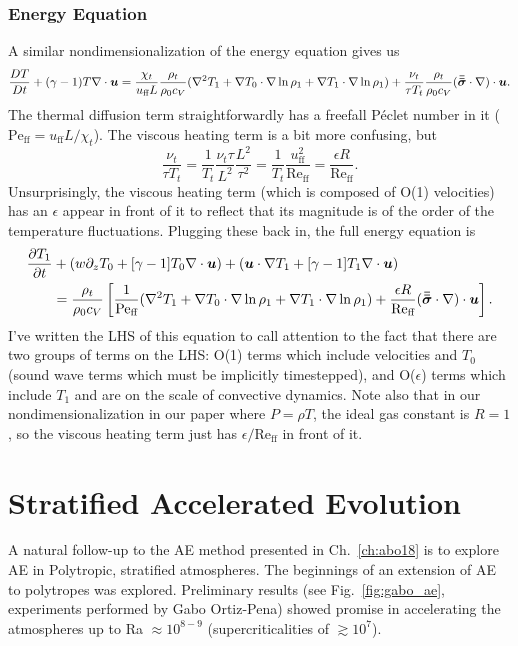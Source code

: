 \subsubsection{Energy Equation}
A similar nondimensionalization of the energy equation gives us
\begin{equation}
\frac{D T}{D t} + (\gamma-1)T \nabla\cdot\bm{u} = 
\frac{\chi_t}{u_{\text{ff}} L}\frac{\rho_t}{\rho_0 c_V} (\nabla^2 T_1 + \nabla T_0\cdot\nabla\ln\rho_1 + \nabla T_1\cdot\nabla\ln\rho_1)
+ \frac{\nu_t}{\tau T_t}\frac{\rho_t}{\rho_0 c_V} (\bm{\bar{\bar{\sigma}}}\cdot\nabla)\cdot\bm{u}.
\end{equation}
The thermal diffusion term straightforwardly has a freefall P\'{e}clet number in it ($\text{Pe}_{\text{ff}} = u_{\text{ff}} L / \chi_t$).
The viscous heating term is a bit more confusing, but
$$
\frac{\nu_t}{\tau T_t} = \frac{1}{T_t}\frac{\nu_t \tau}{L^2} \frac{L^2}{\tau^2} = \frac{1}{T_t}\frac{u_{\text{ff}}^2}{\text{Re}_{\text{ff}}} = \frac{\epsilon R}{\text{Re}_{\text{ff}}}.
$$
Unsurprisingly, the viscous heating term (which is composed of O(1) velocities) has an $\epsilon$ appear in front of it to reflect that its magnitude is of the order of the temperature fluctuations.
Plugging these back in, the full energy equation is
\begin{equation}
\begin{split}
\frac{\partial T_1}{\partial t} &+ (w \partial_z T_0 + [\gamma-1]T_0\nabla\cdot\bm{u}) + (\bm{u}\cdot\nabla T_1 + [\gamma-1] T_1\nabla\cdot\bm{u})
\\
&= \frac{\rho_t}{\rho_0 c_V}\left[
\frac{1}{\text{Pe}_{\text{ff}}}(\nabla^2 T_1 + \nabla T_0 \cdot\nabla\ln\rho_1 + \nabla T_1 \cdot\nabla\ln\rho_1)
+ \frac{\epsilon R}{\text{Re}_{\text{ff}}} (\bm{\bar{\bar{\sigma}}}\cdot\nabla)\cdot\bm{u}
\right].
\end{split}
\end{equation}
I've written the LHS of this equation to call attention to the fact that there are two groups of terms on the LHS: O(1) terms which include velocities and $T_0$ (sound wave terms which must be implicitly timestepped), and O($\epsilon$) terms which include $T_1$ and are on the scale of convective dynamics.
Note also that in our nondimensionalization in our paper where $P = \rho T$, the ideal gas constant is $R = 1$, so the viscous heating term just has $\epsilon/\text{Re}_{\text{ff}}$ in front of it.

\section{Stratified Accelerated Evolution}
\label{sec:stratified_ae}
A natural follow-up to the AE method presented in Ch.~\ref{ch:abo18} is to explore AE in Polytropic, stratified atmospheres.
The beginnings of an extension of AE to polytropes was explored.
Preliminary results (see Fig.~\ref{fig:gabo_ae}, experiments performed by Gabo Ortiz-Pena) showed promise in accelerating the atmospheres up to Ra $\approx 10^{8-9}$ (supercriticalities of $\gtrsim 10^7$).


